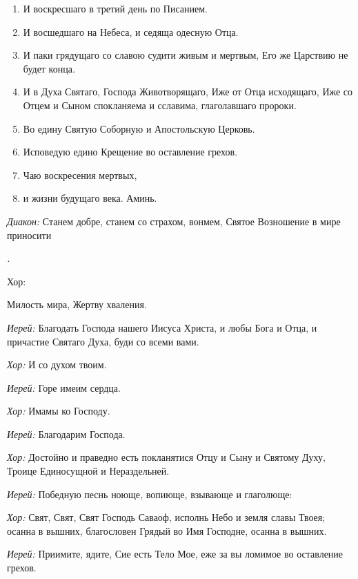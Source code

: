 \begin{mymulticols}
\begin{enumerate}
\item И воскресшаго в третий день по Писанием.

\item И восшедшаго на Небеса, и седяща одесную Отца.

\item И паки грядущаго со славою судити живым и мертвым, Его же Царствию не будет конца.

\item И в Духа Святаго, Господа Животворящаго, Иже от Отца исходящаго, Иже со Отцем и Сыном спокланяема и сславима, глаголавшаго пророки.

\item Во едину Святую Соборную и Апостольскую Церковь.

\item Исповедую едино Крещение во оставление грехов.

\item Чаю воскресения мертвых,

\item и жизни будущаго века. Аминь. 

\end{enumerate}


{\itshape Диакон:} Станем добре, станем со страхом, вонмем, Святое Возношение в мире приносити{\itshape . 

Хор:} Милость мира, Жертву хваления. 

{\itshape Иерей:} Благодать Господа нашего Иисуса Христа, и любы Бога и Отца, и причастие Святаго Духа, буди со всеми вами.

{\itshape Хор:} И со духом твоим. 

{\itshape Иерей:} Горе имеим сердца. 

{\itshape Хор:} Имамы ко Господу. 

{\itshape Иерей:} Благодарим Господа. 

{\itshape Хор:} Достойно и праведно есть покланятися Отцу и Сыну и Святому Духу, Троице Единосущной и Нераздельней.

{\itshape Иерей:} Победную песнь ноюще, вопиюще, взывающе и глаголюще:

{\itshape Хор:} Свят, Свят, Свят Господь Саваоф, исполнь Небо и земля славы Твоея; осанна в вышних, благословен Грядый во Имя Господне, осанна в вышних.

{\itshape Иерей:} Приимите, ядите, Сие есть Тело Мое, еже за вы ломимое во оставление грехов.


\end{mymulticols}

